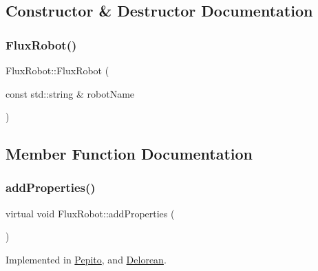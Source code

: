 \subsection{Constructor \& Destructor Documentation}
\mbox{\label{classFluxRobot_aaf20a889c03907de208317746f733d7a}} 
\subsubsection{\texorpdfstring{Flux\+Robot()}{FluxRobot()}}
{\footnotesize\ttfamily Flux\+Robot\+::\+Flux\+Robot (\begin{DoxyParamCaption}\item[{const std\+::string \&}]{robot\+Name }\end{DoxyParamCaption})\hspace{0.3cm}{\ttfamily [explicit]}}



\subsection{Member Function Documentation}
\mbox{\label{classFluxRobot_a6f7940d8f82e80a6e405bad20ec9a5a5}} 
\subsubsection{\texorpdfstring{add\+Properties()}{addProperties()}}
{\footnotesize\ttfamily virtual void Flux\+Robot\+::add\+Properties (\begin{DoxyParamCaption}{ }\end{DoxyParamCaption})\hspace{0.3cm}{\ttfamily [pure virtual]}}



Implemented in \hyperlink{classPepito_a1368f048f197d9b0e3a7e710dd4809fc}{Pepito}, and \hyperlink{classDelorean_a2baeb249408fd1d61da69b1edd832554}{Delorean}.

\mbox{\label{classFluxRobot_aa5fcf98b4dfd539b1b49772381578dc8}} 
